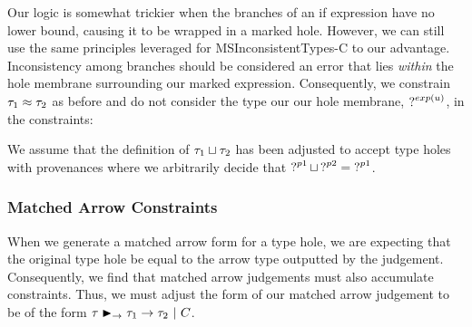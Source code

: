 \begin{mathpar}
\end{mathpar} 

Our logic is somewhat trickier when the branches of an if expression have no lower bound, causing it to be wrapped in a marked hole. However, we can still use the same principles leveraged for MSInconsistentTypes-C to our advantage. Inconsistency among branches should be considered an error that lies \emph{within} the hole membrane surrounding our marked expression. Consequently, we constrain $\TMV_1 \approx \TMV_2$ as before and do not consider the type our our hole membrane, $\TUnknown^{exp(u)}$, in the constraints:
\begin{mathpar}
\end{mathpar}
We assume that the definition of $\TJoin{\TMV_1}{\TMV_2}$ has been adjusted to accept type holes with provenances where we arbitrarily decide that $\TJoin{\TUnknown^{p1}}{\TUnknown^{p2}} = \TUnknown^{p1}$.

\subsubsection{Matched Arrow Constraints}
When we generate a matched arrow form for a type hole, we are expecting that the original type hole be equal to the arrow type outputted by the judgement. Consequently, we find that matched arrow judgements must also accumulate constraints. Thus, we must adjust the form of our matched arrow judgement to be of the form $\matchedArrow{\TMV}{\TMV_1}{\TMV_2} ~|~ C$.


